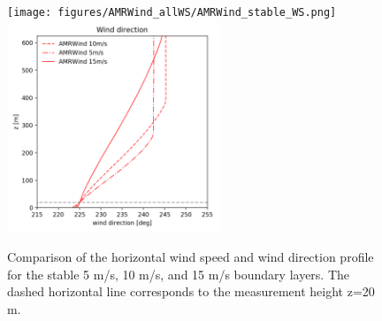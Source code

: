 \begin{figure}[hbt!]
  \centering
  \texttt{[image: figures/AMRWind\_allWS/AMRWind\_stable\_WS.png]}
  \includegraphics[width=2.5in]{figures/AMRWind_allWS/AMRWind_stable_WDir.png}
  \caption{ \label{fig:CompareAMRallWS} Comparison of the horizontal
    wind speed and wind direction profile for the stable 5 m/s, 10
    m/s, and 15 m/s boundary layers. The dashed horizontal line
    corresponds to the measurement height z=20 m.}
\end{figure}

